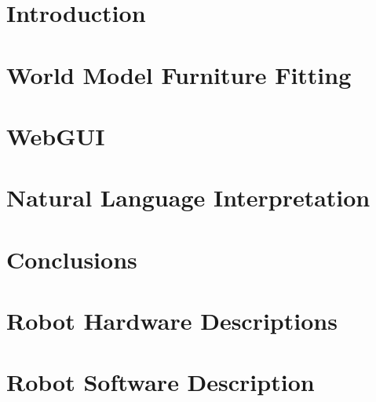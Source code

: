 \documentclass[runningheads,a4paper]{llncs}
\begin{document}

\section{Introduction}


\section{World Model Furniture Fitting}\label{sec:wmfitting}


\section{WebGUI}\label{sec:webgui}

 
\section{Natural Language Interpretation}\label{sec:nli} 


%
%
%
%
%

\section{Conclusions}


\section*{Robot Hardware Descriptions}


\section*{Robot Software Description}

\end{document}
